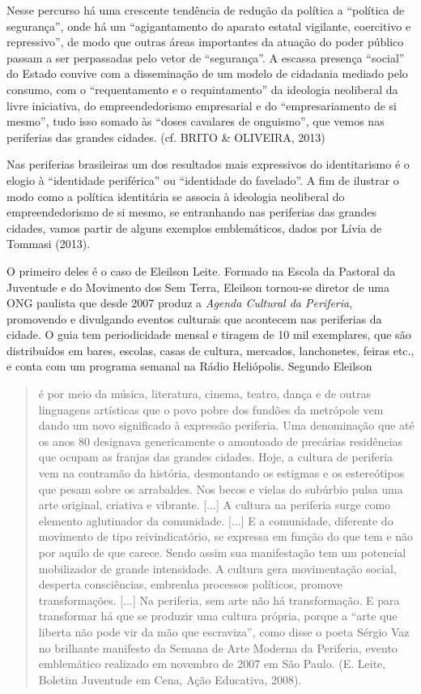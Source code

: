 Nesse percurso há uma crescente tendência de redução da política a
``política de segurança'', onde há um ``agigantamento do aparato estatal
vigilante, coercitivo e repressivo'', de modo que outras áreas
importantes da atuação do poder público passam a ser perpassadas pelo
vetor de ``segurança''. A escassa presença ``social'' do Estado convive
com a disseminação de um modelo de cidadania mediado pelo consumo, com o
``requentamento e o requintamento'' da ideologia neoliberal da livre
iniciativa, do empreendedorismo empresarial e do ``empresariamento de si
mesmo'', tudo isso somado às ``doses cavalares de onguismo'', que vemos
nas periferias das grandes cidades. (cf. BRITO \& OLIVEIRA, 2013)

Nas periferias brasileiras um dos resultados mais expressivos do
identitarismo é o elogio à ``identidade periférica'' ou ``identidade do
favelado''. A fim de ilustrar o modo como a política identitária se
associa à ideologia neoliberal do empreendedorismo de si mesmo, se
entranhando nas periferias das grandes cidades, vamos partir de alguns
exemplos emblemáticos, dados por Lívia de Tommasi (2013).

O primeiro deles é o caso de Eleilson Leite. Formado na Escola da
Pastoral da Juventude e do Movimento dos Sem Terra, Eleilson tornou-se
diretor de uma ONG paulista que desde 2007 produz a \emph{Agenda
Cultural da Periferia}, promovendo e divulgando eventos culturais que
acontecem nas periferias da cidade. O guia tem periodicidade mensal e
tiragem de 10 mil exemplares, que são distribuídos em bares, escolas,
casas de cultura, mercados, lanchonetes, feiras etc., e conta com um
programa semanal na Rádio Heliópolis. Segundo Eleilson

\begin{quote}
é por meio da música, literatura, cinema, teatro, dança e de outras
linguagens artísticas que o povo pobre dos fundões da metrópole vem
dando um novo significado à expressão periferia. Uma denominação que até
os anos 80 designava genericamente o amontoado de precárias residências
que ocupam as franjas das grandes cidades. Hoje, a cultura de periferia
vem na contramão da história, desmontando os estigmas e os estereótipos
que pesam sobre os arrabaldes. Nos becos e vielas do subúrbio pulsa uma
arte original, criativa e vibrante. {[}...{]} A cultura na periferia
surge como elemento aglutinador da comunidade. {[}...{]} E a comunidade,
diferente do movimento de tipo reivindicatório, se expressa em função do
que tem e não por aquilo de que carece. Sendo assim sua manifestação tem
um potencial mobilizador de grande intensidade. A cultura gera
movimentação social, desperta consciências, embrenha processos
políticos, promove transformações. {[}...{]} Na periferia, sem arte não
há transformação. E para transformar há que se produzir uma cultura
própria, porque a ``arte que liberta não pode vir da mão que
escraviza'', como disse o poeta Sérgio Vaz no brilhante manifesto da
Semana de Arte Moderna da Periferia, evento emblemático realizado em
novembro de 2007 em São Paulo. (E. Leite, Boletim Juventude em Cena,
Ação Educativa, 2008).
\end{quote}

